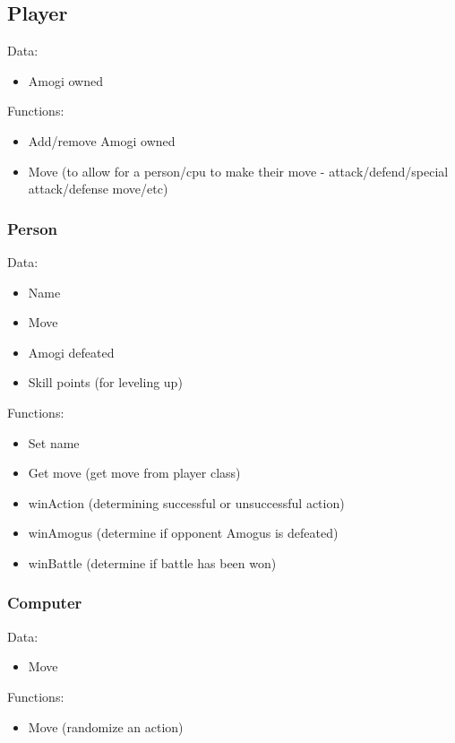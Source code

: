 \documentclass{article}
\begin{document}
  \begin{multicols}{2}
    \subsection{Player}
    Data: 
    \begin{itemize}
      \item Amogi owned
    \end{itemize}
    Functions:
    \begin{itemize}
      \item Add/remove Amogi owned
      \item Move (to allow for a person/cpu to make their move - attack/defend/special attack/defense move/etc)
    \end{itemize}
    
    \subsubsection{Person}
    Data:
    \begin{itemize}
      \item Name
      \item Move
      \item Amogi defeated
      \item Skill points (for leveling up)
    \end{itemize}
    Functions:
    \begin{itemize}
      \item Set name
      \item Get move (get move from player class)
      \item winAction (determining successful or unsuccessful action)
      \item winAmogus (determine if opponent Amogus is defeated)
      \item winBattle (determine if battle has been won)
    \end{itemize}
    
    \subsubsection{Computer}
    Data:
    \begin{itemize}
      \item Move
    \end{itemize}
    Functions:
    \begin{itemize}
      \item Move (randomize an action)
    \end{itemize}
      

\end{multicols}
\end{document}
